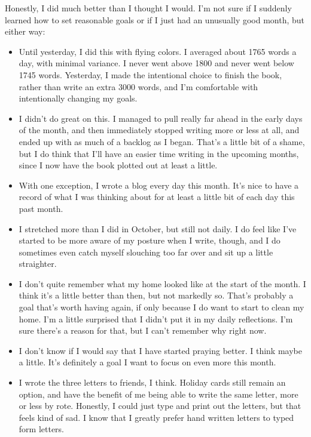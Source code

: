 \documentclass[12pt]{article}[titlepage]
\renewcommand{\,}{\textsuperscript{,}}
\begin{document}
Honestly, I did much better than I thought I would.
I'm not sure if I suddenly learned how to set reasonable goals or if I just had an unusually good month, but either way:
 
\begin{itemize}
\item Until yesterday, I did this with flying colors. I averaged about 1765 words a day, with minimal variance. I never went above 1800 and never went below 1745 words.
Yesterday, I made the intentional choice to finish the book, rather than write an extra 3000 words, and I'm comfortable with intentionally changing my goals.
\item I didn't do great on this. I managed to pull really far ahead in the early days of the month, and then immediately stopped writing more or less at all, and ended up with as much of a backlog as I began.
That's a little bit of a shame, but I do think that I'll have an easier time writing in the upcoming months, since I now have the book plotted out at least a little.
\item With one exception, I wrote a blog every day this month. It's nice to have a record of what I was thinking about for at least a little bit of each day this past month. 
\item I stretched more than I did in October, but still not daily.
I do feel like I've started to be more aware of my posture when I write, though, and I do sometimes even catch myself slouching too far over and sit up a little straighter.
\item I don't quite remember what my home looked like at the start of the month. I think it's a little better than then, but not markedly so.
That's probably a goal that's worth having again, if only because I do want to start to clean my home. I'm a little surprised that I didn't put it in my daily reflections. I'm sure there's a reason for that, but I can't remember why right now.
\item I don't know if I would say that I have started praying better.
I think maybe a little.
It's definitely a goal I want to focus on even more this month.
\item I wrote the three letters to friends, I think.
Holiday cards still remain an option, and have the benefit of me being able to write the same letter, more or less by rote.
Honestly, I could just type and print out the letters, but that feels kind of sad.
I know that I greatly prefer hand written letters to typed form letters. 
\end{itemize}
 
\end{document}
